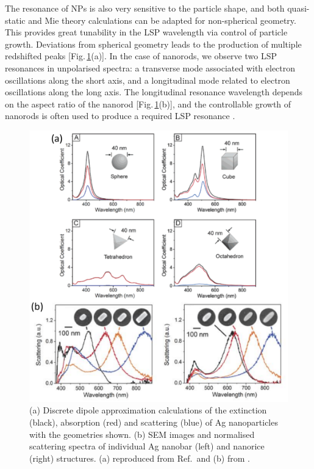 The resonance of NPs is also very sensitive to the particle shape, and both quasi-static and Mie theory calculations can be adapted for non-spherical geometry. This provides great tunability in the LSP wavelength via control of particle growth. Deviations from spherical geometry leads to the production of multiple redshifted peaks [Fig.\,\ref{3Fig10}(a)]. In the case of nanorods, we observe two LSP resonances in unpolarised spectra: a transverse mode associated with electron oscillations along the short axis, and a longitudinal mode related to electron oscillations along the long axis. The longitudinal resonance wavelength depends on the aspect ratio of the nanorod [Fig.\,\ref{3Fig10}(b)], and the controllable growth of nanorods is often used to produce a required LSP resonance \cite{Wiley2006, Wiley2007, Chen2013}.
\begin{figure}[h!] 
\centering    
\includegraphics[width=\textwidth]{Fig10}
\caption{(a) Discrete dipole approximation calculations of the extinction (black), absorption (red) and scattering (blue) of Ag nanoparticles with the geometries shown. (b) SEM images and normalised scattering spectra of individual Ag nanobar (left) and nanorice (right) structures. (a) reproduced from Ref.\,\cite{Wiley2006} and (b) from \cite{Wiley2007}.}
\label{3Fig10}
\end{figure}


